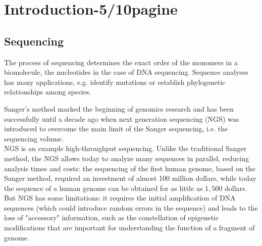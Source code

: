 
\chapter{Introduction-5/10pagine} %

\label{Chapter2} %





\section{Sequencing}

The process of sequencing determines the exact order of the monomers in a biomolecule, the nucleotides in the case of DNA sequencing. Sequence analyses has many applications, e.g. identify mutations or establish phylogenetic relationships among species.



Sanger's method marked the beginning of genomics research and has been successfully until a decade ago when next generation sequencing (NGS) was introduced to overcome the main limit of the Sanger sequencing, i.e. the sequencing volume. \\
NGS is an example  high-throughput sequencing. Unlike the traditional Sanger method, the NGS allows today to analyze many sequences in parallel, reducing analysis times and costs: the sequencing of the first human genome, based on the Sanger method, required an investment of almost 100 million dollars, while today the sequence of a human genome can be obtained for as little as $1,500$ dollars.
But NGS has some limitations: it requires the initial amplification of DNA sequences (which could introduce random errors in the sequence) and leads to the loss of "accessory" information, such as the constellation of epigenetic modifications that are important for understanding the function of a fragment of genome.\\

